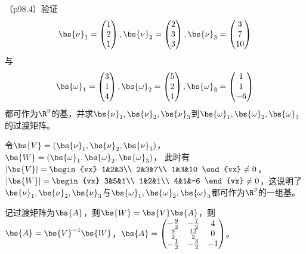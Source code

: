 \documentclass[12pt, a4paper, oneside, UTF8]{ctexbook}
\begin{document}
\begin{question}
    （p98.4）验证
    \begin{align*}
        \bs{\nu}_1=\begin{pmatrix}
            1 \\
            2\\
            1
        \end{pmatrix},\bs{\nu}_2=\begin{pmatrix}
            2\\
            3\\
            3
        \end{pmatrix},\bs{\nu}_3=\begin{pmatrix}
            3\\
            7\\
            10
        \end{pmatrix}
    \end{align*}
    与
    \begin{align*}
        \bs{\omega}_1=\begin{pmatrix}
            3 \\
            1\\
            4
        \end{pmatrix},\bs{\omega}_2=\begin{pmatrix}
            5\\
            2\\
            1
        \end{pmatrix},\bs{\omega}_3=\begin{pmatrix}
            1\\
            1\\
            -6
        \end{pmatrix}
    \end{align*}
    都可作为$\R^3$的基，并求$\bs{\nu}_1,\bs{\nu}_2,\bs{\nu}_3$到$\bs{\omega}_1,\bs{\omega}_2,\bs{\omega}_3$的过渡矩阵。
\end{question}

\begin{solution}
令$\bs{V}=(\bs{\nu}_1,\bs{\nu}_2,\bs{\nu}_3)$，$\bs{W}=(\bs{\omega}_1,\bs{\omega}_2,\bs{\omega}_3)$，
此时有$|\bs{V}|=\begin{vx}
    1&2&3\\
    2&3&7\\
    1&3&10
\end{vx} \neq 0$，$|\bs{W}|=\begin{vx}
    3&5&1\\
    1&2&1\\
    4&1&-6
\end{vx} \neq 0$，这说明了$\bs{\nu}_1,\bs{\nu}_2,\bs{\nu}_3$与$\bs{\omega}_1,\bs{\omega}_2,\bs{\omega}_3$都可作为$\R^3$的一组基。

记过渡矩阵为$\bs{A}$，则$\bs{W}=\bs{V}\bs{A}$，则$\bs{A}=\bs{V}^{-1}\bs{W}$，$\bs{A}=\begin{pmatrix}
    -\frac{9}{2}& -\frac{7}{2}&4 \\
    \frac{9}{2}& \frac{13}{2}& 0 \\
    -\frac{1}{2} &-\frac{3}{2} &-1
\end{pmatrix}$。

\end{solution}
\end{document}
